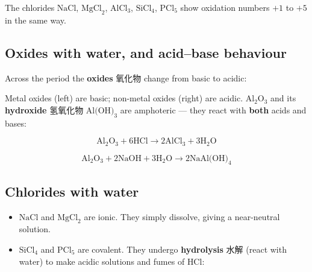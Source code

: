\documentclass[11pt]{article}
\begin{document}
The chlorides $\text{NaCl}$, $\text{MgCl}_2$, $\text{AlCl}_3$, $\text{SiCl}_4$, $\text{PCl}_5$ show oxidation numbers $+1$ to $+5$ in the same way.

\subsection*{Oxides with water, and acid–base behaviour}

Across the period the \textbf{oxides} 氧化物 change from basic to acidic:

\begin{center}
\end{center}

Metal oxides (left) are basic; non-metal oxides (right) are acidic. $\text{Al}_2\text{O}_3$ and its \textbf{hydroxide} 氢氧化物 $\text{Al(OH)}_3$ are amphoteric — they react with \textbf{both} acids and bases:

\[
\text{Al}_2\text{O}_3 + 6\text{HCl} \rightarrow 2\text{AlCl}_3 + 3\text{H}_2\text{O}
\]

\[
\text{Al}_2\text{O}_3 + 2\text{NaOH} + 3\text{H}_2\text{O} \rightarrow 2\text{NaAl(OH)}_4
\]

\subsection*{Chlorides with water}

\begin{itemize}
\item $\text{NaCl}$ and $\text{MgCl}_2$ are ionic. They simply dissolve, giving a near-neutral solution.

\item $\text{SiCl}_4$ and $\text{PCl}_5$ are covalent. They undergo \textbf{hydrolysis} 水解 (react with water) to make acidic solutions and fumes of $\text{HCl}$:

\end{itemize}
\end{document}
